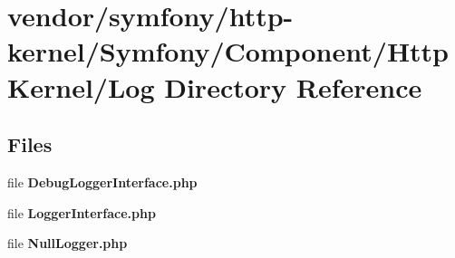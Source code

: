 \section{vendor/symfony/http-\/kernel/\+Symfony/\+Component/\+Http\+Kernel/\+Log Directory Reference}
\label{dir_8598810e172e2633ee62315a72372181}
\subsection*{Files}
\begin{DoxyCompactItemize}
\item 
file {\bf Debug\+Logger\+Interface.\+php}
\item 
file {\bf Logger\+Interface.\+php}
\item 
file {\bf Null\+Logger.\+php}
\end{DoxyCompactItemize}
